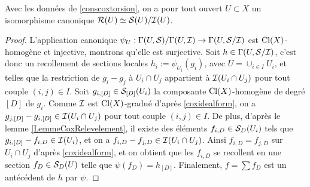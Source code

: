 \begin{prop}\label{coxsheafiso}
Avec les données de \ref{conscoxtorsion}, on a pour tout ouvert $U\subset X$ un isomorphisme canonique $\mathcal{R}(U)\simeq \mathcal{S}(U)/\mathcal{I}(U)$.
\end{prop}
\begin{proof}
L'application canonique $\psi_U:\Gamma(U,\mathcal{S})/\Gamma(U,\mathcal{I})\rightarrow\Gamma(U,\mathcal{S}/\mathcal{I})$ est $\operatorname{Cl}(X)$-homogène et injective, montrons qu'elle est surjective. Soit $h\in\Gamma(U,\mathcal{S}/\mathcal{I})$, c'est donc un recollement de sections locales $h_i:=\psi_{U_i}(g_i)$, avec $U=\cup_{i\in I}U_i$, et telles que la restriction de $g_i-g_j$ à $U_i\cap U_j$ appartient à $\mathcal{I}(U_i\cap U_j)$ pour tout couple $(i,j)\in I$. Soit $g_{i,[D]}\in \mathcal{S}_{[D]}(U_i)$ la composante $\operatorname{Cl}(X)$-homogène de degré $[D]$ de $g_i$. Comme $\mathcal{I}$ est $\operatorname{Cl}(X)$-gradué d'après \ref{coxidealform}, on a $g_{j,[D]}-g_{i,[D]}\in\mathcal{I}(U_i\cap U_j)$ pour tout couple $(i,j)\in I$. De plus, d'après le lemme \ref{LemmeCoxRelevelement}, il existe des éléments $f_{i,D}\in \mathcal{S}_D(U_i)$ tels que $g_{i,[D]}-f_{i,D}\in \mathcal{I}(U_i)$, et on a $f_{i,D}-f_{j,D}\in\mathcal{I}(U_i\cap U_j)$. Ainsi $f_{i,D}=f_{j,D}$ sur $U_i\cap U_j$ d'après \ref{coxidealform}, et on obtient que les $f_{i,D}$ se recollent en une section $f_D\in \mathcal{S}_D(U)$ telle que $\psi(f_D)=h_{[D]}$. Finalement, $f=\sum f_D$ est un antécédent de $h$ par $\psi$.
\end{proof}


